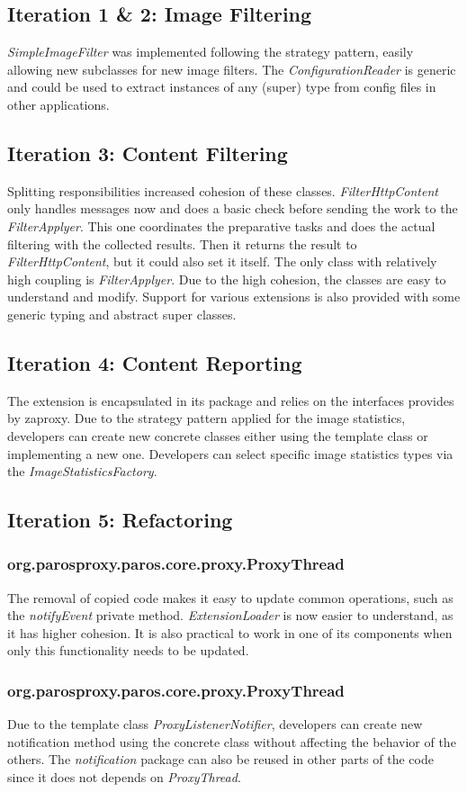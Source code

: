 \subsection{Iteration 1 \& 2: Image Filtering}
\textit{SimpleImageFilter} was implemented following the strategy pattern, easily allowing new subclasses for new image filters.
The \textit{ConfigurationReader} is generic and could be used to extract instances of any (super) type from config files in other applications.

\subsection{Iteration 3: Content Filtering}
Splitting responsibilities increased cohesion of these classes. \textit{FilterHttpContent} only handles messages now and does a basic check before sending the work to the \textit{FilterApplyer}. This one coordinates the preparative tasks and does the actual filtering with the collected results. Then it returns the result to \textit{FilterHttpContent}, but it could also set it itself.
The only class with relatively high coupling is \textit{FilterApplyer}.
Due to the high cohesion, the classes are easy to understand and modify. Support for various extensions is also provided with some generic typing and abstract super classes.
\subsection{Iteration 4: Content Reporting}
The extension is encapsulated in its package and relies on the interfaces provides by zaproxy. Due to the strategy pattern applied for the image statistics, developers can create new concrete classes either using the template class or implementing a new one. Developers can select specific image statistics types via the \textit{ImageStatisticsFactory}.

\subsection{Iteration 5: Refactoring}
\subsubsection{org.parosproxy.paros.core.proxy.ProxyThread}
The removal of copied code makes it easy to update common operations, such as the \textit{notifyEvent} private method.
\textit{ExtensionLoader} is now easier to understand, as it has higher cohesion. It is also practical to work in one of its components when only this functionality needs to be updated.
\subsubsection{org.parosproxy.paros.core.proxy.ProxyThread}

Due to the template class \textit{ProxyListenerNotifier}, developers can create new notification method using the concrete class without affecting the behavior of the others. The \textit{notification} package can also be reused in other parts of the code since it does not depends on \textit{ProxyThread}. 
